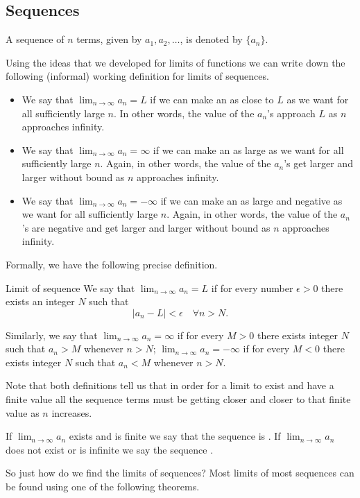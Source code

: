 \subsection{Sequences}
A sequence of $n$ terms, given by $a_1,a_2,\dots$, is denoted by $\{a_n\}$.

Using the ideas that we developed for limits of functions we can write down the following (informal) working definition for limits of sequences.
\begin{itemize}
\item We say that $\lim_{n\to\infty}a_n=L$ if we can make an as close to $L$ as we want for all sufficiently large $n$. In other words, the value of the $a_n$'s approach $L$ as $n$ approaches infinity.
\item We say that $\lim_{n\to\infty}a_n=\infty$ if we can make an as large as we want for all sufficiently large $n$. Again, in other words, the value of the $a_n$'s get larger and larger without bound as $n$ approaches infinity.
\item We say that $\lim_{n\to\infty}a_n=-\infty$ if we can make an as large and negative as we want for all sufficiently large $n$. Again, in other words, the value of the $a_n$'s are negative and get larger and larger without bound as $n$ approaches infinity.
\end{itemize}

Formally, we have the following precise definition.
\begin{defn}{Limit of sequence}{}
We say that $\lim_{n\to\infty}a_n=L$ if for every number $\epsilon>0$ there exists an integer $N$ such that
\[ |a_n-L|<\epsilon \quad \forall n>N. \]

Similarly, we say that $\lim_{n\to\infty}a_n=\infty$ if for every $M>0$ there exists integer $N$ such that $a_n>M$ whenever $n>N$; $\lim_{n\to\infty}a_n=-\infty$ if for every $M<0$ there exists integer $N$ such that $a_n<M$ whenever $n>N$.
\end{defn}

Note that both definitions tell us that in order for a limit to exist and have a finite value all the sequence terms must be getting closer and closer to that finite value as $n$ increases.

If $\lim_{n\to\infty}a_n$ exists and is finite we say that the sequence is . If $\lim_{n\to\infty}a_n$ does not exist or is infinite we say the sequence .

So just how do we find the limits of sequences? Most limits of most sequences can be found using one of the following theorems.

